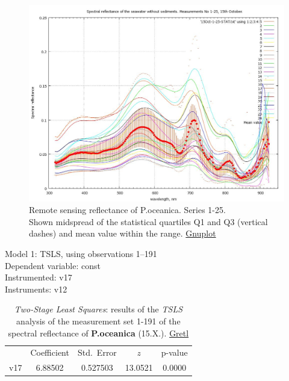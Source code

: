 \documentclass[10pt, a4paper]{article}
\begin{document}
\begin{appendices}
\begin{figure}[H]
	\begin{center}
		\includegraphics[scale=0.25]{GNU-12.jpg}
		\caption{Remote sensing reflectance of P.oceanica. Series 1-25. \\Shown midspread of the statistical quartiles Q1 and Q3 (vertical dashes) and mean value within the range.  \href{http://www.gnuplot.info/}{Gnuplot}­}
		\label{fig:A.26}
	\end{center}
\end{figure}

\begin{table}[htbp]
	\caption{\textit{Two-Stage Least Squares}: results of the \textit{TSLS} analysis of the measurement set 1-191 of the spectral reflectance of \textbf{P.oceanica} (15.X.). \href{http://gretl.sourceforge.net/}{Gretl}}
	\begin{center}
		Model 1: TSLS, using observations 1--191\\
		Dependent variable: const\\
		Instrumented: v17 \\
		Instruments: v12 \\

	\vspace{1em}

	\begin{tabular}{|c c c c c|}
		  &  {Coefficient} &  {Std.\ Error} &  {$z$} &    {p-value} \\[1ex]
		v17 &  6.88502 & 0.527503 & 13.0521 & 0.0000 \\
	\end{tabular}


\end{center}
\end{table}
\end{appendices}
\end{document}

